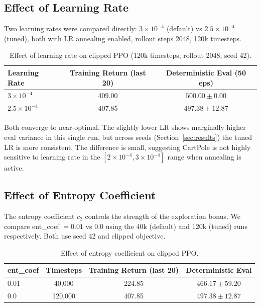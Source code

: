 \documentclass[12pt,a4paper]{article}
\begin{document}
\subsection{Effect of Learning Rate}

Two learning rates were compared directly: $3\times10^{-4}$ (default) vs $2.5\times10^{-4}$ (tuned), both with LR annealing enabled, rollout steps 2048, 120k timesteps.

\begin{table}[H]
\centering
\caption{Effect of learning rate on clipped PPO (120k timesteps, rollout 2048, seed 42).}
\label{tab:lr}
\begin{tabular}{lcc}
\toprule
\textbf{Learning Rate} & \textbf{Training Return (last 20)} & \textbf{Deterministic Eval (50 eps)} \\
\midrule
$3\times10^{-4}$   & 409.00 & $500.00 \pm 0.00$ \\
$2.5\times10^{-4}$ & 407.85 & $497.38 \pm 12.87$ \\
\bottomrule
\end{tabular}
\end{table}

Both converge to near-optimal. The slightly lower LR shows marginally higher eval variance in this single run, but across seeds (Section~\ref{sec:results}) the tuned LR is more consistent. The difference is small, suggesting CartPole is not highly sensitive to learning rate in the $[2\times10^{-4}, 3\times10^{-4}]$ range when annealing is active.

\subsection{Effect of Entropy Coefficient}

The entropy coefficient $c_2$ controls the strength of the exploration bonus. We compare ent\_coef $= 0.01$ vs $0.0$ using the 40k (default) and 120k (tuned) runs respectively. Both use seed 42 and clipped objective.

\begin{table}[H]
\centering
\caption{Effect of entropy coefficient on clipped PPO.}
\label{tab:ent}
\begin{tabular}{lccc}
\toprule
\textbf{ent\_coef} & \textbf{Timesteps} & \textbf{Training Return (last 20)} & \textbf{Deterministic Eval} \\
\midrule
0.01 & 40{,}000  & 224.85 & $466.17 \pm 59.20$ \\
0.0  & 120{,}000 & 407.85 & $497.38 \pm 12.87$ \\
\bottomrule
\end{tabular}
\end{table}
\end{document}
